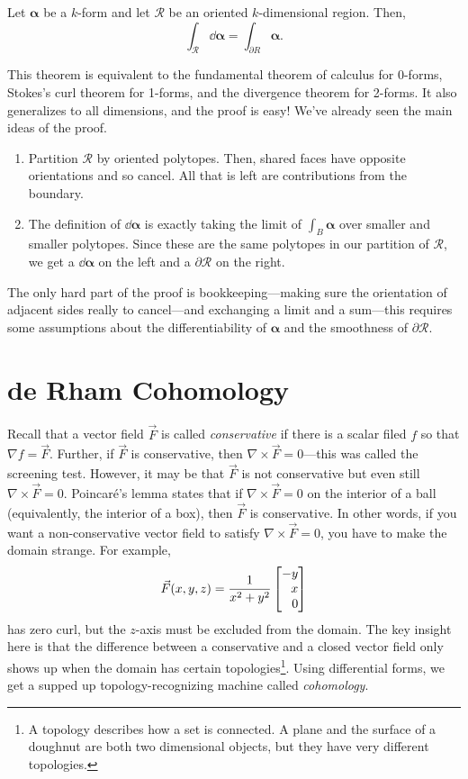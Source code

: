 \begin{theorem}
	Let $\bm\alpha$ be a $k$-form and let $\mathcal R$ be an oriented
	$k$-dimensional region.  Then,
	\[
		\int_{\mathcal R} \dd \bm\alpha = \int_{\partial R} \bm\alpha.
	\]
\end{theorem}

This theorem is equivalent to the fundamental theorem of calculus for 0-forms,
Stokes's curl theorem for 1-forms, and the divergence theorem for 2-forms.  It also
generalizes to all dimensions, and the proof is easy!  We've already seen the main ideas
of the proof.
\begin{enumerate}
	\item Partition $\mathcal R$ by oriented polytopes.  Then, shared faces have opposite
orientations and so cancel.  All that is left are contributions from the boundary.
	\item The definition of $\dd \bm\alpha$ is exactly taking the limit of $\int_B\bm\alpha$
		over smaller and smaller polytopes.  Since these are the same polytopes
		in our partition of $\mathcal R$, we get a $\dd \bm\alpha$ on the left
		and a $\partial \mathcal R$ on the right.
\end{enumerate}
The only hard part of the proof is bookkeeping---making sure the orientation of adjacent
sides really to cancel---and exchanging a limit and a sum---this requires some assumptions
about the differentiability of $\bm\alpha$ and the smoothness of $\partial \mathcal R$.

\section{de Rham Cohomology}

Recall that a vector field $\vec F$ is called \emph{conservative} if
there is a scalar filed $f$ so that $\nabla f=\vec F$.  Further, if $\vec F$ is
conservative, then $\nabla \times \vec F=0$---this was called the screening test.
However, it may be that $\vec F$ is not conservative but even still
$\nabla \times \vec F=0$.  Poincar\'e's lemma states that if $\nabla \times \vec F=0$
on the interior of a ball (equivalently, the interior of a box), then $\vec F$ is conservative.
In other words, if you want a non-conservative vector field to satisfy $\nabla \times\vec F=0$,
you have to make the domain strange.  For example, 
\[
	\vec F(x,y,z) = \frac{1}{x^2+y^2}\mat{-y\\x\\0}
\]
has zero curl, but the $z$-axis must be excluded from the domain.  The key insight here
is that the difference between a conservative and a closed vector field only shows
up when the domain has certain topologies\footnote{ A topology describes how a set is
connected.  A plane and the surface of a doughnut are both two dimensional objects, but they have
very different topologies.}.  Using differential forms, we get a supped up topology-recognizing
machine called \emph{cohomology}.

